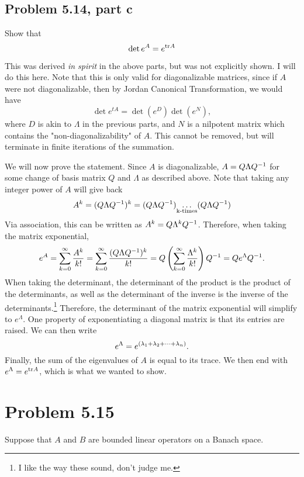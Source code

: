 \subsection{Problem 5.14, part c}
Show that 
\[\det e^A = e^{\text{tr} A}\]
\partbreak
\begin{solution}

    This was derived \textit{in spirit} in the above parts, but was not explicitly shown. I will do this here. Note that this is only valid for diagonalizable matrices, since if $A$ were not diagonalizable, then by Jordan Canonical Transformation, we would have 
    \[\det e^{tA} = \det \left(e^{D}\right)\det \left( e^{N}\right),\]
    where $D$ is akin to $\Lambda$ in the previous parts, and $N$ is a nilpotent matrix which contains the "non-diagonalizability" of $A$. This cannot be removed, but will terminate in finite iterations of the summation. \par

    \hop
    We will now prove the statement. Since $A$ is diagonalizable, $A = Q\Lambda Q^{-1}$ for some change of basis matrix $Q$ and $\Lambda$ as described above. Note that taking any integer power of $A$ will give back
    \[A^k = (Q\Lambda Q^{-1} )^k = (Q\Lambda Q^{-1} ) \underset{\text{k-times}}{\dots} (Q\Lambda Q^{-1} )\]
    Via association, this can be written as $A^k = Q \Lambda^k Q^{-1}$. Therefore, when taking the matrix exponential, 
    \[e^A = \sum_{k = 0}^\infty \frac{A^k}{k!} = \sum_{k = 0}^\infty \frac{(Q\Lambda Q^{-1})^k}{k!} = Q\left(\sum_{k = 0}^\infty \frac{\Lambda^k}{k!}\right) Q^{-1} = Qe^\Lambda Q^{-1}.\]
    When taking the determinant, the determinant of the product is the product of the determinants, as well as the determinant of the inverse is the inverse of the determinants.\footnote{I like the way these sound, don't judge me.} Therefore, the determinant of the matrix exponential will simplify to $e^\Lambda$. One property of exponentiating a diagonal matrix is that its entries are raised. We can then write 
    \[e^\Lambda = e^{(\mathrm{\lambda}_1 + \mathrm{\lambda}_2 + \cdots + \mathrm{\lambda}_n)}.\]
    Finally, the sum of the eigenvalues of $A$ is equal to its trace. We then end with $e^\Lambda = e^{\text{tr} A}$, which is what we wanted to show.
\end{solution}
\newpage
\section{Problem 5.15}
Suppose that $A$ and $B$ are bounded linear operators on a Banach space. 
